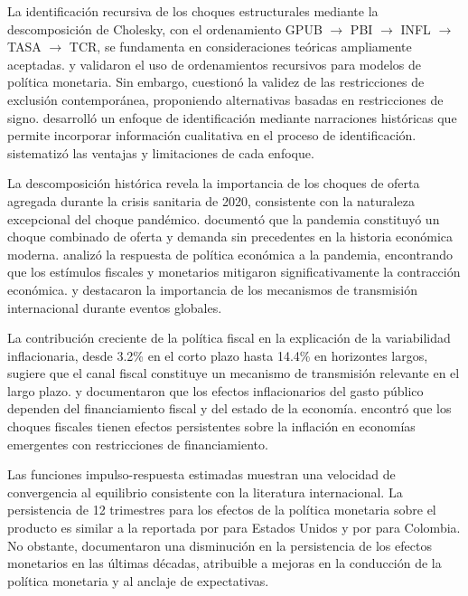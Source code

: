 \documentclass[12pt,a4paper]{article}
\begin{document}
La identificación recursiva de los choques estructurales mediante la descomposición de Cholesky, con el ordenamiento GPUB $\to$ PBI $\to$ INFL $\to$ TASA $\to$ TCR, se fundamenta en consideraciones teóricas ampliamente aceptadas. \citet{christiano1999} y \citet{kim2000} validaron el uso de ordenamientos recursivos para modelos de política monetaria. Sin embargo, \citet{uhlig2005} cuestionó la validez de las restricciones de exclusión contemporánea, proponiendo alternativas basadas en restricciones de signo. \citet{rubio2020} desarrolló un enfoque de identificación mediante narraciones históricas que permite incorporar información cualitativa en el proceso de identificación. \citet{kilian2019} sistematizó las ventajas y limitaciones de cada enfoque.

La descomposición histórica revela la importancia de los choques de oferta agregada durante la crisis sanitaria de 2020, consistente con la naturaleza excepcional del choque pandémico. \citet{gali2023} documentó que la pandemia constituyó un choque combinado de oferta y demanda sin precedentes en la historia económica moderna. \citet{jordà2022} analizó la respuesta de política económica a la pandemia, encontrando que los estímulos fiscales y monetarios mitigaron significativamente la contracción económica. \citet{kutner2021} y \citet{caporale2020} destacaron la importancia de los mecanismos de transmisión internacional durante eventos globales.

La contribución creciente de la política fiscal en la explicación de la variabilidad inflacionaria, desde 3.2\% en el corto plazo hasta 14.4\% en horizontes largos, sugiere que el canal fiscal constituye un mecanismo de transmisión relevante en el largo plazo. \citet{blanchard2002} y \citet{perotti2004} documentaron que los efectos inflacionarios del gasto público dependen del financiamiento fiscal y del estado de la economía. \citet{rojas2020} encontró que los choques fiscales tienen efectos persistentes sobre la inflación en economías emergentes con restricciones de financiamiento.

Las funciones impulso-respuesta estimadas muestran una velocidad de convergencia al equilibrio consistente con la literatura internacional. La persistencia de 12 trimestres para los efectos de la política monetaria sobre el producto es similar a la reportada por \citet{primiceri2005} para Estados Unidos y por \citet{restrepo2015} para Colombia. No obstante, \citet{boivin2010} documentaron una disminución en la persistencia de los efectos monetarios en las últimas décadas, atribuible a mejoras en la conducción de la política monetaria y al anclaje de expectativas.
\end{document}
